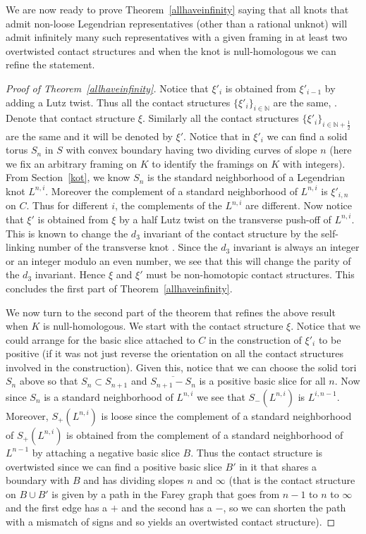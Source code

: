 \documentclass[11pt]{amsart}
\theoremstyle{plain}
\theoremstyle{definition}
\theoremstyle{remark}
\numberwithin{theorem}{section}
\newcommand{\N}{\mathbb{N}}           %
\begin{document}
We are now ready to prove Theorem~\ref{allhaveinfinity} saying that all knots that admit non-loose Legendrian representatives (other than a rational unknot) will admit infinitely many such representatives with a given framing in at least two overtwisted contact structures and when the knot is null-homologous we can refine the statement.
\begin{proof}[Proof of Theorem~\ref{allhaveinfinity}]
Notice that $\xi'_i$ is obtained from $\xi'_{i-1}$ by adding a Lutz twist. Thus all the contact structures $\{\xi'_i\}_{i\in\N}$ are the same, \cite{Geiges08}. Denote that contact structure $\xi$. Similarly all the contact structures $\{\xi'_i\}_{i\in \N+\frac 12}$ are the same and it will be denoted by $\xi'$. Notice that in $\xi'_i$ we can find a solid torus $S_n$ in $S$ with convex boundary having two dividing curves of slope $n$ (here we fix an arbitrary framing on $K$ to identify the framings on $K$ with integers). From Section~\ref{kot}, we know $S_n$ is the standard neighborhood of a Legendrian knot $L^{n,i}$. Moreover the complement of a standard neighborhood of $L^{n,i}$ is $\xi'_{i,n}$ on $C$. Thus for different $i$, the complements of the $L^{n,i}$ are different. Now notice that $\xi'$ is obtained from $\xi$ by a half Lutz twist on the transverse push-off of $L^{n,i}$. This is known to change the $d_3$ invariant of the contact structure by the self-linking number of the transverse knot \cite[Proof of Theorem~4.3.1]{Geiges08}. Since the $d_3$ invariant is always an integer or an integer modulo an even number, we see that this will change the parity of the $d_3$ invariant. Hence $\xi$ and $\xi'$ must be non-homotopic contact structures. This concludes the first part of Theorem~\ref{allhaveinfinity}.

We now turn to the second part of the theorem that refines the above result when $K$ is null-homologous. We start with the contact structure $\xi$. Notice that we could arrange for the basic slice attached to $C$ in the construction of $\xi'_i$ to be positive (if it was not just reverse the orientation on all the contact structures involved in the construction). Given this, notice that we can choose the solid tori $S_n$ above so that $S_n\subset S_{n+1}$ and $\overline{S_{n+1}- S_n}$ is a positive basic slice for all $n$. Now since $S_n$ is a standard neighborhood of $L^{n,i}$ we see that $S_-(L^{n,i})$ is $L^{i,n-1}$. Moreover, $S_+(L^{n,i})$ is loose since the complement of a standard neighborhood of $S_+(L^{n,i})$ is obtained from the complement of a standard neighborhood of $L^{n-1}$ by attaching a negative basic slice $B$. Thus the contact structure is overtwisted since we can find a positive basic slice $B'$ in it that shares a boundary with $B$ and has dividing slopes $n$ and $\infty$ (that is the contact structure on $B\cup B'$ is given by a path in the Farey graph that goes from $n-1$ to $n$ to $\infty$ and the first edge has a $+$ and the second has a $-$, so we can shorten the path with a mismatch of signs and so yields an overtwisted contact structure). 


\end{proof}
\end{document}
